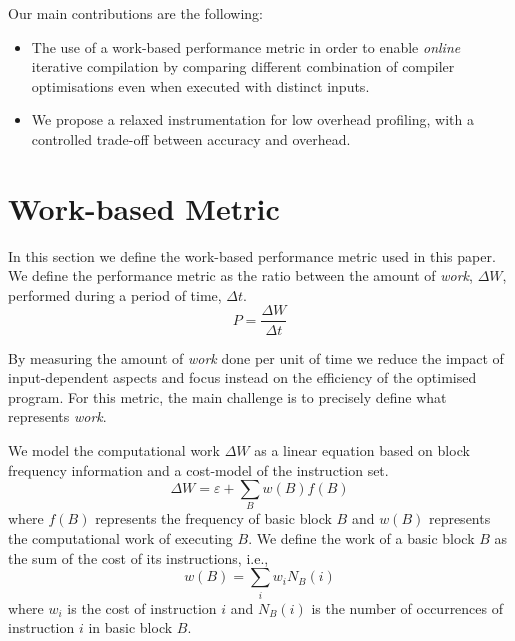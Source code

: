 \documentclass[sigplan,10pt]{acmart}
\newcommand{\itercomp}{{iterative compilation}}
\begin{document}
Our main contributions are the following:
\begin{itemize}
\item The use of a work-based performance metric in order to enable \textit{online} {\itercomp} by comparing different combination of compiler optimisations even when executed with distinct inputs.
\item We propose a relaxed instrumentation for low overhead profiling, with a controlled trade-off between accuracy and overhead.
\end{itemize}

\section{Work-based Metric} \label{sec:metric}

In this section we define the work-based performance metric used in this paper.
We define the performance metric as the ratio between the amount of \textit{work}, $\Delta W$, performed during a period of time, $\Delta t$.
\[
   P = \frac{\Delta W}{\Delta t}
\]

By measuring the amount of \textit{work} done per unit of time we reduce the impact of input-dependent aspects and focus instead on the efficiency of the optimised program.
For this metric, the main challenge is to precisely define what represents \textit{work}.



We model the computational work $\Delta W$ as a linear equation based on block frequency information and a cost-model of the instruction set.
\[
\Delta W = \varepsilon + \sum_{B} w(B)f(B)
\]
where $f(B)$ represents the frequency of basic block $B$ and $w(B)$ represents the computational work of executing $B$.
We define the work of a basic block $B$ as the sum of the cost of its instructions, i.e.,
\[
w(B) = \sum_{i} w_i N_B(i)
\]
where $w_i$ is the cost of instruction $i$ and $N_B(i)$ is the number of occurrences of instruction $i$ in basic block $B$.
\end{document}
